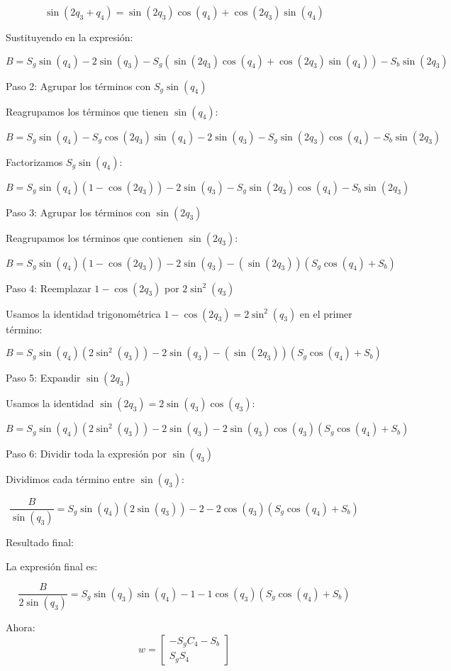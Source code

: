\documentclass[a4paper,12pt]{article}
\begin{document}
\[
\sin(2q_3 + q_4) = \sin(2q_3)\cos(q_4) + \cos(2q_3)\sin(q_4)
\]

Sustituyendo en la expresión:

\[
B = S_g \sin(q_4) - 2\sin(q_3) - S_g (\sin(2q_3)\cos(q_4) + \cos(2q_3)\sin(q_4)) - S_b \sin(2q_3)
\]

 Paso 2: Agrupar los términos con \( S_g \sin(q_4) \)

Reagrupamos los términos que tienen \( \sin(q_4) \):

\[
B = S_g \sin(q_4) - S_g \cos(2q_3)\sin(q_4) - 2\sin(q_3) - S_g \sin(2q_3)\cos(q_4) - S_b \sin(2q_3)
\]

Factorizamos \( S_g \sin(q_4) \):

\[
B = S_g \sin(q_4)(1 - \cos(2q_3)) - 2\sin(q_3) - S_g \sin(2q_3)\cos(q_4) - S_b \sin(2q_3)
\]

 Paso 3: Agrupar los términos con \( \sin(2q_3) \)

Reagrupamos los términos que contienen \( \sin(2q_3) \):

\[
B = S_g \sin(q_4)(1 - \cos(2q_3)) - 2\sin(q_3) - (\sin(2q_3))(S_g \cos(q_4) + S_b)
\]

 Paso 4: Reemplazar \( 1 - \cos(2q_3) \) por \( 2\sin^2(q_3) \)

Usamos la identidad trigonométrica \( 1 - \cos(2q_3) = 2\sin^2(q_3) \) en el primer término:

\[
B = S_g \sin(q_4)(2\sin^2(q_3)) - 2\sin(q_3) - (\sin(2q_3))(S_g \cos(q_4) + S_b)
\]

 Paso 5: Expandir \( \sin(2q_3) \)

Usamos la identidad \( \sin(2q_3) = 2\sin(q_3)\cos(q_3) \):

\[
B = S_g \sin(q_4)(2\sin^2(q_3)) - 2\sin(q_3) - 2\sin(q_3)\cos(q_3)(S_g \cos(q_4) + S_b)
\]

 Paso 6: Dividir toda la expresión por \( \sin(q_3) \)

Dividimos cada término entre \( \sin(q_3) \):

\[
\frac{B}{\sin(q_3)} = S_g \sin(q_4)(2\sin(q_3)) - 2 - 2\cos(q_3)(S_g \cos(q_4) + S_b)
\]

 Resultado final:

La expresión final es:

\[
\frac{B}{2\sin(q_3)} = S_g \sin(q_3)\sin(q_4) - 1 - 1\cos(q_3)(S_g \cos(q_4) + S_b)
\]

Ahora: 
\begin{equation}
    w =
    \begin{bmatrix}
        -S_gC_4 - S_b\\
        S_gS_4
    \end{bmatrix}
\end{equation}
\end{document}
